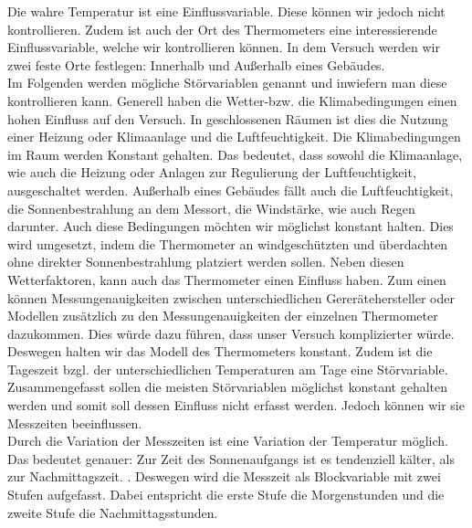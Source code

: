 \documentclass[ ngerman, fontsize= 12pt, paper=a4, headings=big, titlepage=true]{article}
\begin{document}
	Die wahre Temperatur ist eine Einflussvariable. Diese können wir jedoch nicht kontrollieren.  Zudem ist auch der Ort des Thermometers eine interessierende Einflussvariable, welche wir kontrollieren können. In dem Versuch werden wir zwei feste Orte festlegen: Innerhalb und Außerhalb eines Gebäudes. \\
	
	
	Im Folgenden werden mögliche Störvariablen genannt und inwiefern man diese kontrollieren kann. Generell haben die Wetter-bzw. die Klimabedingungen einen hohen Einfluss auf den Versuch.  In geschlossenen Räumen ist dies die Nutzung einer Heizung oder Klimaanlage und die Luftfeuchtigkeit. Die Klimabedingungen im Raum werden Konstant gehalten. Das bedeutet, dass sowohl die Klimaanlage, wie auch die Heizung oder Anlagen zur Regulierung der Luftfeuchtigkeit, ausgeschaltet werden. Außerhalb eines Gebäudes fällt auch die Luftfeuchtigkeit, die Sonnenbestrahlung an dem Messort, die Windstärke, wie auch Regen darunter. Auch diese Bedingungen möchten wir möglichst konstant halten. Dies wird umgesetzt, indem die Thermometer an windgeschützten und überdachten ohne direkter Sonnenbestrahlung platziert werden sollen. Neben diesen Wetterfaktoren, kann auch das Thermometer einen Einfluss haben. Zum einen können Messungenauigkeiten zwischen unterschiedlichen Gererätehersteller oder Modellen zusätzlich zu den Messungenauigkeiten der einzelnen Thermometer dazukommen. Dies würde dazu führen, dass unser Versuch komplizierter würde. Deswegen halten wir das Modell des Thermometers konstant. Zudem ist die Tageszeit bzgl. der unterschiedlichen Temperaturen am Tage eine Störvariable. \\
	
	Zusammengefasst sollen die meisten Störvariablen möglichst konstant gehalten werden und somit soll dessen Einfluss nicht erfasst werden. Jedoch können wir sie Messzeiten beeinflussen.  \\
	
	Durch die Variation der Messzeiten ist eine Variation der Temperatur möglich. Das bedeutet genauer: Zur Zeit des Sonnenaufgangs ist es tendenziell kälter, als zur Nachmittagszeit. \cite{WK2}. Deswegen wird die Messzeit als Blockvariable mit zwei Stufen aufgefasst. Dabei  entspricht die erste Stufe die Morgenstunden und die zweite Stufe die Nachmittagsstunden. 
	
\end{document}
